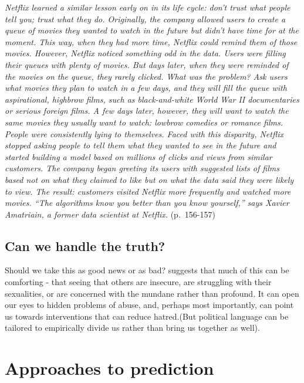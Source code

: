 \documentclass[]{book}
\theoremstyle{definition}
\theoremstyle{definition}
\theoremstyle{definition}
\theoremstyle{remark}
\begin{document}
\emph{Netflix learned a similar lesson early on in its life cycle: don't
trust what people tell you; trust what they do. Originally, the company
allowed users to create a queue of movies they wanted to watch in the
future but didn't have time for at the moment. This way, when they had
more time, Netflix could remind them of those movies. However, Netflix
noticed something odd in the data. Users were filling their queues with
plenty of movies. But days later, when they were reminded of the movies
on the queue, they rarely clicked. What was the problem? Ask users what
movies they plan to watch in a few days, and they will fill the queue
with aspirational, highbrow films, such as black-and-white World War II
documentaries or serious foreign films. A few days later, however, they
will want to watch the same movies they usually want to watch: lowbrow
comedies or romance films. People were consistently lying to themselves.
Faced with this disparity, Netflix stopped asking people to tell them
what they wanted to see in the future and started building a model based
on millions of clicks and views from similar customers. The company
began greeting its users with suggested lists of films based not on what
they claimed to like but on what the data said they were likely to view.
The result: customers visited Netflix more frequently and watched more
movies. ``The algorithms know you better than you know yourself,'' says
Xavier Amatriain, a former data scientist at Netflix.} (p.~156-157)

\section{Can we handle the truth?}\label{can-we-handle-the-truth}

Should we take this as good news or as bad?
\citet{stephens2017everybody} suggests that much of this can be
comforting - that seeing that others are insecure, are struggling with
their sexualities, or are concerned with the mundane rather than
profound. It can open our eyes to hidden problems of abuse, and, perhaps
most importantly, can point us towards interventions that can reduce
hatred.(But political language can be tailored to empirically divide us
rather than bring us together as well).

\chapter{Approaches to prediction}\label{approaches-to-prediction}
\end{document}
